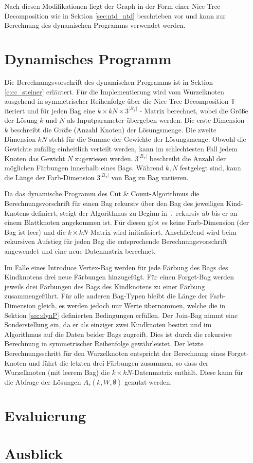 Nach diesen Modifikationen liegt der Graph in der Form einer Nice Tree Decomposition wie in Sektion \ref{sec:ntd_ntd} beschrieben vor und kann zur Berechnung des dynamischen Programms verwendet werden.

\section{Dynamisches Programm}
\label{sec:impl_dynP}
Die Berechnungsvorschrift des dynamischen Programms ist in Sektion \ref{c:cc_steiner} erläutert. Für die Implementierung wird vom Wurzelknoten ausgehend in symmetrischer Reihenfolge über die Nice Tree Decomposition $\mathbb{T}$ iteriert und für jeden Bag eine $k \times kN \times 3^{|B_x|}$ - Matrix berechnet, wobei die Größe der Lösung $k$ und $N$ als Inputparameter übergeben werden. Die erste Dimension $k$ beschreibt die Größe (Anzahl Knoten) der Lösungsmenge. Die zweite Dimension $kN$ steht für die Summe der Gewichte der Lösungsmenge. Obwohl die Gewichte zufällig einheitlich verteilt werden, kann im schlechtesten Fall jedem Knoten das Gewicht $N$ zugewiesen werden. $3^{|B_x|}$ beschreibt die Anzahl der möglichen Färbungen innerhalb eines Bags. Während $k,N$ festgelegt sind, kann die Länge der Farb-Dimension $3^{|B_x|}$ von Bag zu Bag variieren. 

Da das dynamische Programm des Cut \& Count-Algorithmus die Berechnungsvorschrift für einen Bag rekursiv über den Bag des jeweiligen Kind-Knotens definiert, steigt der Algorithmus zu Beginn in $\mathbb{T}$ rekursiv ab bis er an einem Blattknoten angekommen ist. Für diesen gibt es keine Farb-Dimension (der Bag ist leer) und die $k \times kN$-Matrix wird initialisiert. Anschließend wird beim rekursiven Aufstieg für jeden Bag die entsprechende Berechnungsvorschrift angewendet und eine neue Datenmatrix berechnet. 

Im Falle eines \glqq Introduce Vertex\grqq -Bag werden für jede Färbung des Bags des Kindknotens drei neue Färbungen hinzugefügt. Für einen \glqq Forget\grqq -Bag werden jeweils drei Färbungen des Bags des Kindknotens zu einer Färbung zusammengeführt. Für alle anderen Bag-Typen bleibt die Länge der Farb-Dimension gleich, es werden jedoch nur Werte übernommen, welche die in Sektion \ref{sec:dynP} definierten Bedingungen erfüllen. Der \glqq Join\grqq -Bag nimmt eine Sonderstellung ein, da er als einziger zwei Kindknoten besitzt und im Algorithmus auf die Daten beider Bags zugreift. Dies ist durch die rekursive Berechnung in symmetrischer Reihenfolge gewährleistet. Der letzte Berechnungsschritt für den Wurzelknoten entspricht der Berechnung eines \glqq Forget\grqq -Knoten und führt die letzten drei Färbungen zusammen, so dass der Wurzelknoten (mit leerem Bag) die $k \times kN$-Datenmatrix enthält. Diese kann für die Abfrage der Lösungen $A_r(k,W,\emptyset)$ genutzt werden.
\section{Evaluierung}
\label{sec:eval}

\section{Ausblick}
\label{sec:outlook}
